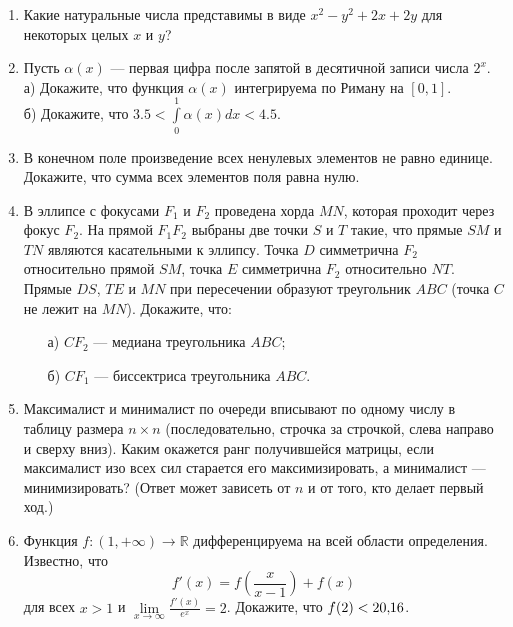 \begin{enumerate}

\item Какие натуральные числа представимы в виде $x^2-y^2+2x+2y$ для некоторых целых $x$ и $y$?

\item Пусть  $\alpha(x)$ --- первая цифра после запятой в десятичной записи числа $2^x$.\\
а) Докажите, что функция $\alpha(x)$ интегрируема по Риману на $[0, 1]$.\\
б) Докажите, что $\displaystyle 3.5 < \int\limits_{0}^{1} \alpha(x) dx < 4.5$.

\item В конечном поле произведение всех ненулевых элементов не равно единице. Докажите, что сумма всех элементов поля равна нулю.

\item В эллипсе с фокусами $F_1$ и $F_2$ проведена хорда $MN$, которая проходит через фокус $F_2$. На прямой $F_1F_2$ выбраны две точки $S$ и $T$ такие, что прямые $SM$ и $TN$ являются касательными к эллипсу. Точка $D$ симметрична $F_2$ относительно прямой $SM$, точка $E$ симметрична $F_2$ относительно $NT$. Прямые $DS$, $TE$ и $MN$ при пересечении образуют треугольник $ABC$ (точка $C$ не лежит на $MN$). Докажите, что:
\begin{itemize}
\item[а)] $CF_2$ --- медиана треугольника $ABC$;
\item[б)] $CF_1$ --- биссектриса треугольника $ABC$.
\end{itemize}

\item Максималист и минималист по очереди вписывают по одному числу в таблицу размера $n \times n$ (последовательно, строчка за строчкой, слева направо и сверху вниз). Каким окажется ранг получившейся матрицы, если максималист изо всех сил старается его максимизировать, а минималист --- минимизировать? (Ответ может зависеть от $n$ и от того, кто делает первый ход.) 
 
\item Функция $f : (1, +\infty) \rightarrow \mathbb{R}$ дифференцируема на всей области определения. Известно, что  $$\displaystyle f'(x) = f\left( \frac{x}{x-1} \right) + f(x)$$ для всех $x > 1$ и $\displaystyle \lim\limits_{x \to \infty} \frac{f'(x)}{e^x} = 2$. Докажите, что $f(2) < 20,\hspace{-2pt}16$.

\end{enumerate}
